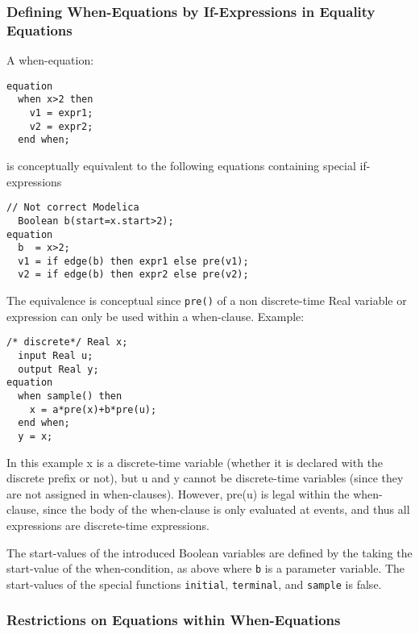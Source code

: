 \subsubsection{Defining When-Equations by If-Expressions in Equality Equations}

A when-equation:
\begin{lstlisting}[language=modelica]
equation
  when x>2 then
    v1 = expr1;
    v2 = expr2;
  end when;
\end{lstlisting}

is conceptually equivalent to the following equations containing special
if-expressions

\begin{lstlisting}[language=modelica]
  // Not correct Modelica
  Boolean b(start=x.start>2);
equation
  b  = x>2;
  v1 = if edge(b) then expr1 else pre(v1);
  v2 = if edge(b) then expr2 else pre(v2);
\end{lstlisting}

\begin{nonnormative}
The equivalence is conceptual since \lstinline!pre()! of a non
discrete-time Real variable or expression can only be used within a
when-clause. Example:
\begin{lstlisting}[language=modelica]
  /* discrete*/ Real x;
  input Real u;
  output Real y;
equation
  when sample() then
    x = a*pre(x)+b*pre(u);
  end when;
  y = x;
\end{lstlisting}

In this example x is a discrete-time variable (whether it is
declared with the discrete prefix or not), but u and y cannot be
discrete-time variables (since they are not assigned in when-clauses).
However, pre(u) is legal within the when-clause, since the body of the
when-clause is only evaluated at events, and thus all expressions are
discrete-time expressions.
\end{nonnormative}

The start-values of the introduced Boolean variables are defined by the
taking the start-value of the when-condition, as above where \lstinline!b! is a
parameter variable. The start-values of the special functions \lstinline!initial!,
\lstinline!terminal!, and \lstinline!sample! is false.

\subsubsection{Restrictions on Equations within When-Equations}

